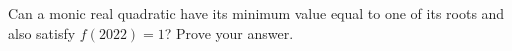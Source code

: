 Can a monic real quadratic have its minimum value equal to one of its roots and also satisfy $f(2022)=1$? Prove your answer.
